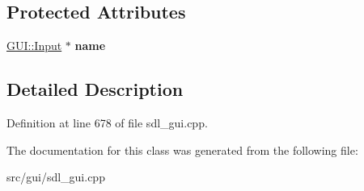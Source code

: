 \subsection*{Protected Attributes}
\begin{DoxyCompactItemize}
\item 
\hypertarget{classSetVsyncrate_a7c739c3ee8c8f232c6f753c531f88c59}{\hyperlink{classGUI_1_1Input}{G\-U\-I\-::\-Input} $\ast$ {\bfseries name}}\label{classSetVsyncrate_a7c739c3ee8c8f232c6f753c531f88c59}

\end{DoxyCompactItemize}


\subsection{Detailed Description}


Definition at line 678 of file sdl\-\_\-gui.\-cpp.



The documentation for this class was generated from the following file\-:\begin{DoxyCompactItemize}
\item 
src/gui/sdl\-\_\-gui.\-cpp\end{DoxyCompactItemize}
